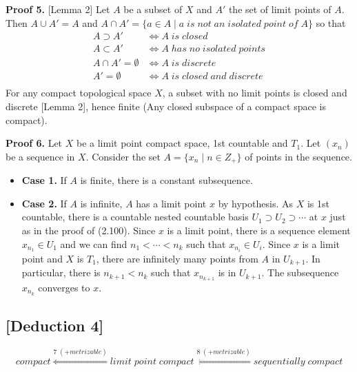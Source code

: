 \documentclass[11pt]{diazessay} %
\begin{document}
\vskip 10pt
\textbf{Proof 5.} [Lemma 2] Let $A$ be a subset of $X$ and $A'$ the set of limit points of $A$. Then $A \cup A' = A$
and $A \cap A' = \{a \in A \; | \; a \; is \; not \; an \; isolated \; point \; of \; A\}$ so that
$$
\begin{aligned}
	A \supset A' &\iff A \; is \; closed\\
	A \subset A' &\iff A \; has \; no \; isolated \; points\\
	A \cap A' = \emptyset&\iff A \; is \; discrete\\
	A' = \emptyset &\iff A \; is \; closed \; and \; discrete\\
\end{aligned}
$$
For any compact topological space $X$, a subset with no limit points is closed and
discrete [Lemma 2], hence finite (Any closed subspace of a compact space is compact).

\vskip 10pt
\textbf{Proof 6.} Let $X$ be a limit point compact space, 1st countable and $T_1$. Let $(x_n)$ be a sequence
in $X$. Consider the set $A = \{x_n \; | \; n \in Z_+\}$ of points in the sequence. 
\begin{itemize}
	\item \textbf{Case 1.} If $A$ is finite, there is a constant subsequence. 
	
	\vskip	5pt
	\item \textbf{Case 2.} If $A$ is infinite, $A$ has a limit point $x$ by hypothesis. As $X$ is 1st countable, there
	is a countable nested countable basis $U_1 \supset U_2 \supset \cdots$ at $x$ just as in the proof of \cite{1}(2.100). Since $x$ is a
	limit point, there is a sequence element $x_{n_1} \in U_1$ and we can find $n_1 < \cdots < n_k$ such that
	$x_{n_i} \in U_i$. Since $x$ is a limit point and $X$ is $T_1$, there are infinitely many points from $A$ in $U_{k+1}$. In
	particular, there is $n_{k+1} < n_k$ such that $x_{n_{k+1}}$ is in $U_{k+1}$. The subsequence $x_{n_k}$ converges to $x$.
\end{itemize}

\vskip 10pt
\subsection*{[Deduction 4]}
\vskip -10pt
\begin{equation}
	compact \overset{7\; (+metrizable)}{\Longleftarrow} limit \; point \; compact \overset{8\; (+metrizable)}{\Longleftarrow} sequentially \; compact 
\end{equation}
\end{document}

